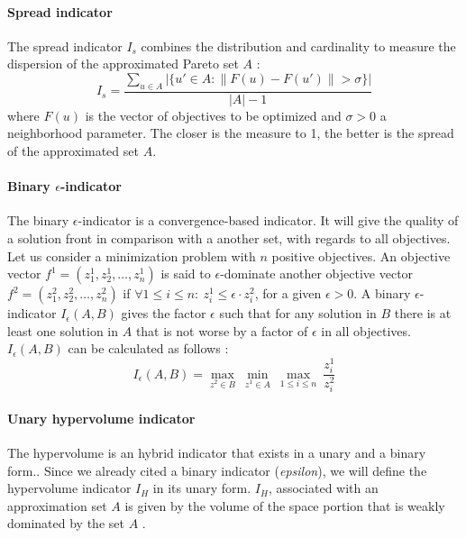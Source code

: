 \paragraph{Spread indicator}

The spread indicator $I_s$ combines the distribution and cardinality to measure the dispersion of the approximated Pareto set $A$ \cite{talbi09}:
\begin{equation}
I_s = \frac{\sum_{u \in A}|\{u' \in A: \|F(u)-F(u')\|>\sigma\}|}{|A|-1}
\end{equation}
where $F(u)$ is the vector of objectives to be optimized and $\sigma > 0$ a neighborhood parameter. The closer is the measure to 1, the better is the spread of the approximated set $A$.

\paragraph{Binary $\epsilon$-indicator}
The binary $\epsilon$-indicator is a convergence-based indicator. It will give the quality of a solution front in comparison with a another set, with regards to all objectives. Let us consider a minimization problem with $n$ positive objectives. An objective vector $f^1 = (z_1^1, z_2^1, \dots, z_n^1)$ is said to $\epsilon$-dominate another objective vector $f^2 = (z_1^2, z_2^2, \dots, z_n^2)$ if $\forall 1 \leq i \leq n : \: z_i^1 \leq \epsilon \cdot z_i^2$, for a given $\epsilon > 0$. A binary $\epsilon$-indicator $I_\epsilon(A,B)$ gives the factor $\epsilon$ such that for any solution in $B$ there is at least one solution in $A$ that is not worse by a factor of $\epsilon$ in all objectives. $I_\epsilon(A,B)$ can be calculated as follows \cite{1197687}:
\begin{equation}
I_\epsilon(A,B) = \max\limits_{z^2 \in B} \: \min_{z^1 \in A} \: \max_{1 \leq i \leq n} \: \frac{z_i^1}{z_i^2}
\end{equation}

\paragraph{Unary hypervolume indicator}
The hypervolume is an hybrid indicator that exists in a unary and a binary form.. Since we already cited a binary indicator (\textit{epsilon}), we will define the hypervolume indicator $I_H$ in its unary form. $I_H$, associated with an approximation set $A$ is given by the volume of the space portion that is weakly dominated by the set $A$ \cite{talbi09}.

